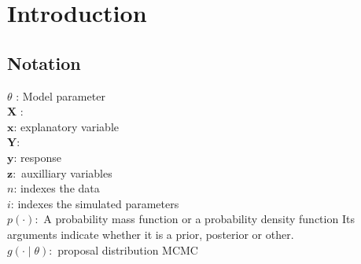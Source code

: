 \chapter{Introduction}
\label{sec:intro}

\section{Notation}
$\theta$ : Model parameter \\
$\mathbf{X}$ : \\
$\mathbf{x}$: explanatory variable \\
$\mathbf{Y}$: \\
$\mathbf{y}$: response \\
$\mathbf{z}:$ auxilliary variables \\ 
$n$: indexes the data \\ 
$i$: indexes the simulated parameters \\
$p\left(\cdot\right):$ A probability mass function or a probability density function  Its arguments indicate whether it is a prior, posterior or other.  \\
$g\left(\cdot\mid \theta \right):$ proposal distribution MCMC

